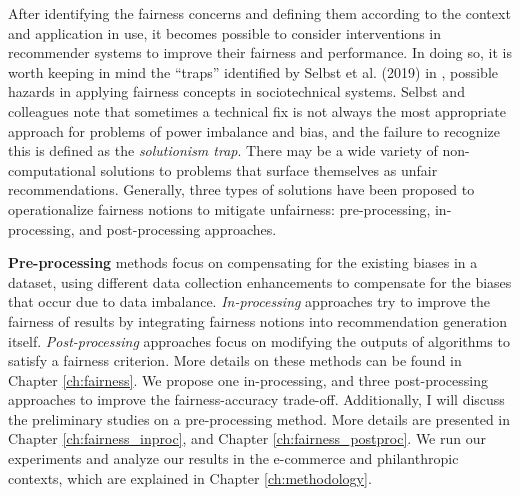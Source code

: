     After identifying the fairness concerns and defining them according to the context and application in use, it becomes possible to consider interventions in recommender systems to improve their fairness and performance. In doing so, it is worth keeping in mind the ``traps'' identified by Selbst et al. (2019) in \cite{selbst2019fairness}, possible hazards in applying fairness concepts in sociotechnical systems. Selbst and colleagues note that sometimes a technical fix is not always the most appropriate approach for problems of power imbalance and bias, and the failure to recognize this is defined as the \textit{solutionism trap}. There may be a wide variety of non-computational solutions to problems that surface themselves as unfair recommendations. Generally, three types of solutions have been proposed to operationalize fairness notions to mitigate unfairness: pre-processing, in-processing, and post-processing approaches.
    
    \textbf{Pre-processing} methods focus on compensating for the existing biases in a dataset, using different data collection enhancements to compensate for the biases that occur due to data imbalance. \textit{In-processing} approaches try to improve the fairness of results by integrating fairness notions into recommendation generation itself. \textit{Post-processing} approaches focus on modifying the outputs of algorithms to satisfy a fairness criterion. More details on these methods can be found in Chapter \ref{ch:fairness}. We propose one in-processing, and three post-processing approaches to improve the fairness-accuracy trade-off. Additionally, I will discuss the preliminary studies on a pre-processing method. More details are presented in Chapter \ref{ch:fairness_inproc}, and Chapter \ref{ch:fairness_postproc}. We run our experiments and analyze our results in the e-commerce and philanthropic contexts, which are explained in Chapter \ref{ch:methodology}.




